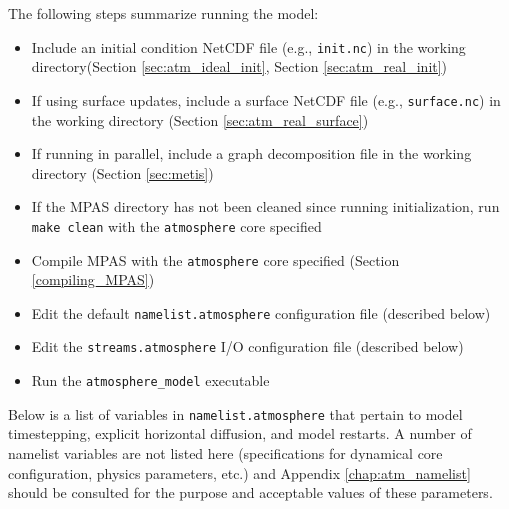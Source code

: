The following steps summarize running the model:

\begin{itemize}
\item Include an initial condition NetCDF file (e.g., {\tt init.nc}) in the working directory(Section \ref{sec:atm_ideal_init}, Section \ref{sec:atm_real_init})
\item If using surface updates, include a surface NetCDF file (e.g., {\tt surface.nc}) in the working directory (Section \ref{sec:atm_real_surface})
\item If running in parallel, include a graph decomposition file in the working directory (Section \ref{sec:metis})
\item If the MPAS directory has not been cleaned since running initialization, run {\tt make clean} with the {\tt atmosphere} core specified
\item Compile MPAS with the {\tt atmosphere} core specified (Section \ref{compiling_MPAS})
\item Edit the default {\tt namelist.atmosphere} configuration file (described below)
\item Edit the {\tt streams.atmosphere} I/O configuration file (described below)
\item Run the {\tt atmosphere\_model} executable
\end{itemize}

Below is a list of variables in {\tt namelist.atmosphere} that pertain to model timestepping, explicit horizontal diffusion, and model restarts.  A number of namelist variables are not listed here (specifications for dynamical core configuration, physics parameters, etc.) and Appendix \ref{chap:atm_namelist} should be consulted for the purpose and acceptable values of these parameters.

